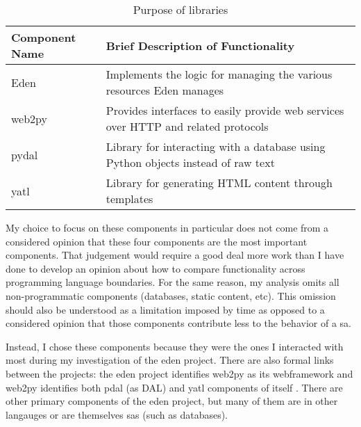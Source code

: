 \documentclass[a4paper,man,natbib,floatsintext]{apa6}
\begin{document}
  \begin{table}[ht]
  \caption{Purpose of libraries}
  \label{tab:table-1}
  \begin{tabular}{|l|p{}|}
  \hline
  Component Name & Brief Description of Functionality                                                 \\ \hline
  Eden           & Implements the logic for managing the various resources Eden manages               \\ \hline
  web2py         & Provides interfaces to easily provide web services over HTTP and related protocols \\ \hline
  pydal          & Library for interacting with a database using Python objects instead of raw text   \\ \hline
  yatl           & Library for generating HTML content through templates                              \\ \hline
  \end{tabular}
\end{table}
  
  My choice to focus on these components in particular does not come from a considered opinion that these four components are the most important components. That judgement would require a good deal more work than I have done to develop an opinion about how to compare functionality across programming language boundaries. For the same reason, my analysis omits all non-programmatic components (databases, static content, etc). This omission should also be understood as a limitation imposed by time as opposed to a considered opinion that those components contribute less to the behavior of a \gls{sa}. 

  Instead, I chose these components because they were the ones I interacted with most during my investigation of the \acrshort{eden} project. There are also formal links between the projects: the \acrshort{eden} project identifies web2py as its \gls{webframework} and web2py identifies both pdal (as DAL) and yatl components of itself \citep{Di_Pierro2020-wn,Sahana_Foundation_undated-ww}. There are other primary components of the \acrshort{eden} project, but many of them are in other langauges or are themselves \glspl{sa} (such as databases).
\end{document}
